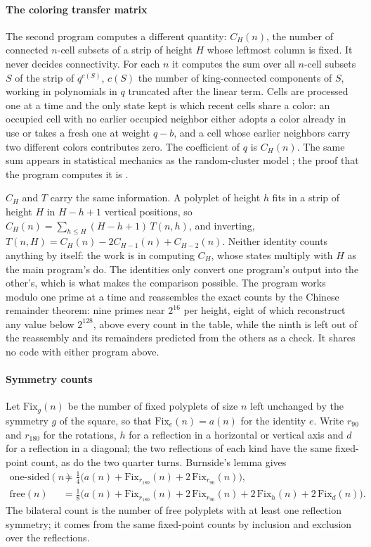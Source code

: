 \documentclass[11pt]{article}
\begin{document}
\paragraph{The coloring transfer matrix} The second program computes a
different quantity: $C_H(n)$, the number of connected $n$-cell subsets of a
strip of height $H$ whose leftmost column is fixed. It never decides
connectivity. For each $n$ it computes the sum over all $n$-cell subsets $S$
of the strip of $q^{c(S)}$, $c(S)$ the number of king-connected components of
$S$, working in polynomials in $q$ truncated after the linear term. Cells are
processed one at a time and the only state kept is which recent cells share a
color: an occupied cell with no earlier occupied neighbor either adopts a
color already in use or takes a fresh one at weight $q - b$, and a cell whose
earlier neighbors carry two different colors contributes zero. The
coefficient of $q$ is $C_H(n)$. The same sum appears in statistical
mechanics as the random-cluster model \cite{fortuinKasteleyn1972}; the proof
that the program computes it is .

$C_H$ and $T$ carry the same information. A polyplet of height $h$ fits in a
strip of height $H$ in $H - h + 1$ vertical positions, so $C_H(n) = \sum_{h
\le H} (H-h+1)\,T(n,h)$, and inverting, $T(n,H) = C_H(n) - 2C_{H-1}(n) +
C_{H-2}(n)$. Neither identity counts anything by itself: the work is in
computing $C_H$, whose states multiply with $H$ as the main program's do. The
identities only convert one program's output into the other's, which is what
makes the comparison possible. The program works modulo one prime at a time and
reassembles the exact counts by the Chinese remainder theorem: nine primes
near $2^{16}$ per height, eight of which reconstruct any value below
$2^{128}$, above every count in the table, while the ninth is left out of the
reassembly and its remainders predicted from the others as a check. It shares no code with either program above.

\paragraph{Symmetry counts}
\label{sec:symmetry}
Let $\mathrm{Fix}_g(n)$ be the number of fixed polyplets of size $n$ left
unchanged by the symmetry $g$ of the square, so that $\mathrm{Fix}_e(n) =
a(n)$ for the identity $e$. Write $r_{90}$ and $r_{180}$ for the rotations,
$h$ for a reflection in a horizontal or vertical axis and $d$ for a
reflection in a diagonal; the two reflections of each kind have the same
fixed-point count, as do the two quarter turns. Burnside's lemma
\cite{stanley2012} gives
\begin{align*}
  \text{one-sided}(n) &= \tfrac14\bigl(a(n) + \mathrm{Fix}_{r_{180}}(n)
      + 2\,\mathrm{Fix}_{r_{90}}(n)\bigr), \\
  \text{free}(n) &= \tfrac18\bigl(a(n) + \mathrm{Fix}_{r_{180}}(n)
      + 2\,\mathrm{Fix}_{r_{90}}(n) + 2\,\mathrm{Fix}_{h}(n)
      + 2\,\mathrm{Fix}_{d}(n)\bigr).
\end{align*}
The bilateral count is the number of free polyplets with at least one
reflection symmetry; it comes from the same fixed-point counts by inclusion
and exclusion over the reflections.
\end{document}
